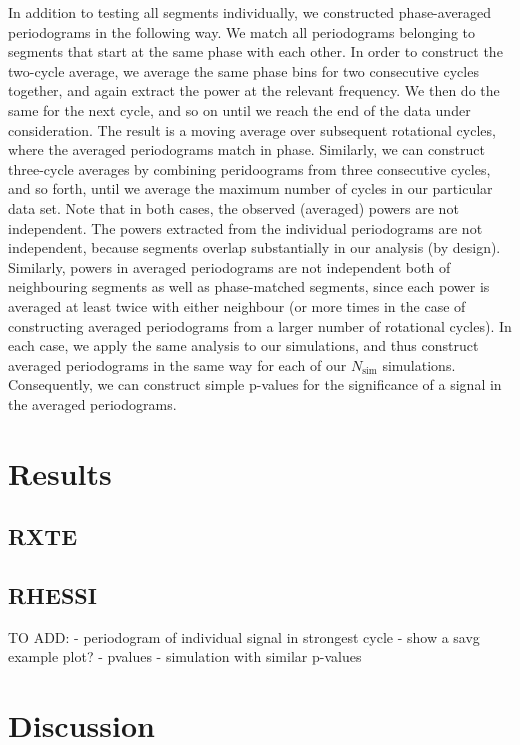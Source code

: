 \documentclass{emulateapj}
\begin{document}
In addition to testing all segments individually, we constructed phase-averaged periodograms in the following way. We match all periodograms belonging to segments that start at the same phase with each other. In order to construct the two-cycle average, we average the same phase bins for two consecutive cycles together, and again extract the power at the relevant frequency. We then do the same for the next cycle, and so on until we reach the end of the data under consideration. The result is a moving average over subsequent rotational cycles, where the averaged periodograms match in phase.
Similarly, we can construct three-cycle averages by combining peridoograms from three consecutive cycles, and so forth, until we average the maximum number of cycles in our particular data set. Note that in both cases, the observed (averaged) powers are not independent. The powers extracted from the individual periodograms are not independent, because segments overlap substantially in our analysis (by design). 
Similarly, powers in averaged periodograms are not independent both of neighbouring segments as well as phase-matched segments, since each power is averaged at least twice with either neighbour (or more times in the case of constructing averaged periodograms from a larger number of rotational cycles). 
In each case, we apply the same analysis to our simulations, and thus construct averaged periodograms in the same way for each of our $N_\mathrm{sim}$ simulations. Consequently, we can construct simple p-values for the significance of a signal in the averaged periodograms. 
 

\section{Results}
\label{sec:results}

\subsection{RXTE}
\label{sec:rxte_results}

\subsection{RHESSI}
\label{sec:rhessi_results}

TO ADD:
- periodogram of individual signal in strongest cycle
- show a savg example plot?
- pvalues
- simulation with similar p-values


\section{Discussion}
\label{sec:discussion}
\end{document}
